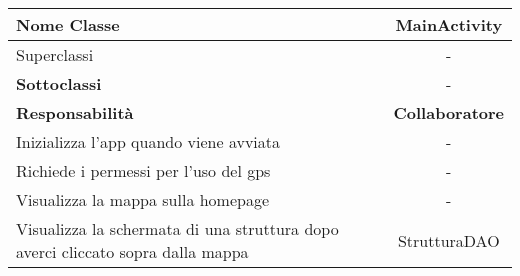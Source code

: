 
\setcounter{table}{0}
\begin{table}[H]
    \centering
    \begin{tabularx}{\textwidth}{||   X  ||  c   ||}
        \hline
        \rowcolor{Gray}
        \textbf{Nome Classe} & MainActivity\\
        \hline
        Superclassi  &  - \\
        \hline
        \textbf{Sottoclassi} & - \\
        \hline
        \hline
         \textbf{Responsabilità} & \textbf{Collaboratore} \\
         \hline
            Inizializza l'app quando viene avviata & - \\
         \hline
          Richiede i permessi per l'uso del gps & - \\
         \hline
          Visualizza la mappa sulla homepage & - \\
         \hline
          Visualizza la schermata di una struttura dopo averci cliccato sopra dalla mappa & StrutturaDAO \\
         \hline
    \end{tabularx}
\end{table}
